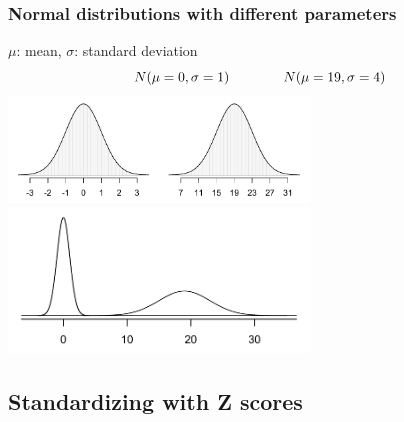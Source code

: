 \begin{frame}
\frametitle{Normal distributions with different parameters}

\vspace{-0.5cm}
\begin{center}
$\mu$: mean, $\sigma$: standard deviation
\[N(\mu = 0, \sigma = 1) \hspace{1.4cm} N(\mu = 19, \sigma = 4) \]
\includegraphics[width=0.6\textwidth]{4-1_normal_distribution/figures/twoSampleNormals/twoSampleNormals} \\
\includegraphics[width=0.6\textwidth]{4-1_normal_distribution/figures/twoSampleNormalsStacked/twoSampleNormalsStacked}
\end{center}

\end{frame}


\subsection{Standardizing with Z scores}



